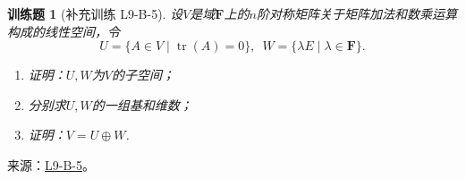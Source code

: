 \documentclass[UTF8,12pt,a4paper,fontset=fandol]{ctexart}
\newtheorem{exercise}{训练题}[section]
\begin{document}
\begin{exercise}[补充训练 L9-B-5]\label{prob:L9-B-5}
设$V$是域$\mathbf{F}$上的$n$阶对称矩阵关于矩阵加法和数乘运算构成的线性空间，令
        \[U=\{A\in V \mid \operatorname{tr}(A)=0\},\enspace W=\{\lambda E \mid \lambda\in\mathbf{F}\}.\]
        \begin{enumerate}
            \item 证明：$U,W$为$V$的子空间；

            \item 分别求$U,W$的一组基和维数；

            \item 证明：$V=U\oplus W$.
        \end{enumerate}
\end{exercise}
\noindent 来源：\href{https://github.com/yhwu-is/Linear-Algebra-Left-Undone/blob/new/%E8%AE%B2%E4%B9%89/%E4%B8%93%E9%A2%98/9%20%E7%9F%A9%E9%98%B5%E8%BF%90%E7%AE%97%E8%BF%9B%E9%98%B6.tex}{L9-B-5}。
\end{document}
